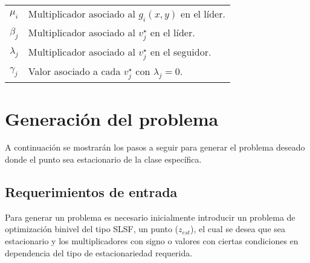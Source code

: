 \begin{table}[H]
\begin{tabular}{l m{360pt}}
        $\mu_i $                & Multiplicador asociado al $g_i(x,y)$ en el líder.  \\
        $ \beta_j $               & Multiplicador asociado al $v_{j}^{\star}$ en el líder.          \\
        $ \lambda_j $              & Multiplicador asociado al $v_{j}^{\star}$ en el seguidor.\\
        $\gamma_j$                & Valor asociado a cada $v_{j}^{\star}$ con $\lambda_j=0$.\\
    \end{tabular}

    \end{table}

\newpage
\section{Generación del problema}
A continuación se mostrarán los pasos a seguir para generar el problema deseado donde el punto sea estacionario de la clase específica.

\subsection{Requerimientos de entrada}

Para generar un problema es necesario inicialmente introducir un problema de optimización binivel del tipo SLSF, un punto ($z_{est}$), el cual
se desea que sea estacionario y los multiplicadores con signo o valores con ciertas condiciones en dependencia del tipo de estacionariedad requerida.

